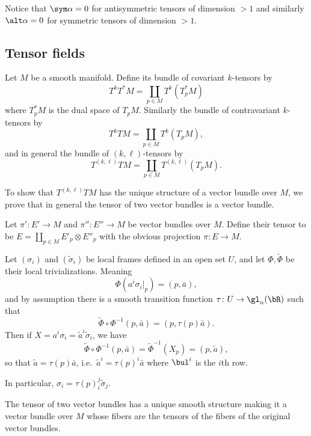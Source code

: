Notice that $\sym\alpha=0$ for antisymmetric tensors of dimension $>1$ and similarly $\alt\alpha=0$ for symmetric tensors of dimension $>1$.

\subsection{Tensor fields}

\bdefn

    Let $M$ be a smooth manifold.
    Define its {\emphcolor bundle of covariant $k$-tensors} by
    $$ T^kT^*M = \coprod_{p\in M}T^k(T^*_pM) $$
    where $T_p^*M$ is the dual space of $T_pM$.
    Similarly the {\emphcolor bundle of contravariant $k$-tensors} by
    $$ T^kTM = \coprod_{p\in M}T^k(T_pM) , $$
    and in general the {\emphcolor bundle of $(k,\ell)$-tensors} by
    $$ T^{(k,\ell)}TM = \coprod_{p\in M}T^{(k,\ell)}(T_pM) . $$

\edefn

To show that $T^{(k,\ell)}TM$ has the unique structure of a vector bundle over $M$, we prove that in general the tensor of two vector bundles is a vector bundle.

\bdefn

    Let $\pi'\colon E'\to M$ and $\pi''\colon E''\to M$ be vector bundles over $M$.
    Define their {\emphcolor tensor} to be $E=\coprod_{p\in M}E'_p\otimes E''_p$ with the obvious projection $\pi\colon E\to M$.

\edefn

Let $(\sigma_i)$ and $(\tilde\sigma_i)$ be local frames defined in an open set $U$, and let $\Phi,\tilde\Phi$ be their local trivializations.
Meaning
$$ \Phi(a^i\sigma_i|_p) = (p,\bar a), $$
and by assumption there is a smooth transition function $\tau\colon U\to\gl_n(\bR)$ such that
$$ \tilde\Phi\circ\Phi^{-1}(p,\bar a) = (p,\tau(p)\bar a) . $$
Then if $X=a^i\sigma_i=\tilde a^i\tilde\sigma_i$, we have
$$ \tilde\Phi\circ\Phi^{-1}(p,\bar a) = \tilde\Phi^{-1}(X_p) = (p,\tilde a), $$
so that $\tilde a=\tau(p)\bar a$, i.e.\ $\tilde a^i=\tau(p)^i\bar a$ where $\bul^i$ is the $i$th row.

In particular, $\sigma_i=\tau(p)^j_i\tilde\sigma_j$.

\bprop

    The tensor of two vector bundles has a unique smooth structure making it a vector bundle over $M$ whose fibers are the tensors of the fibers of the original
    vector bundles.

\eprop

\bproof

